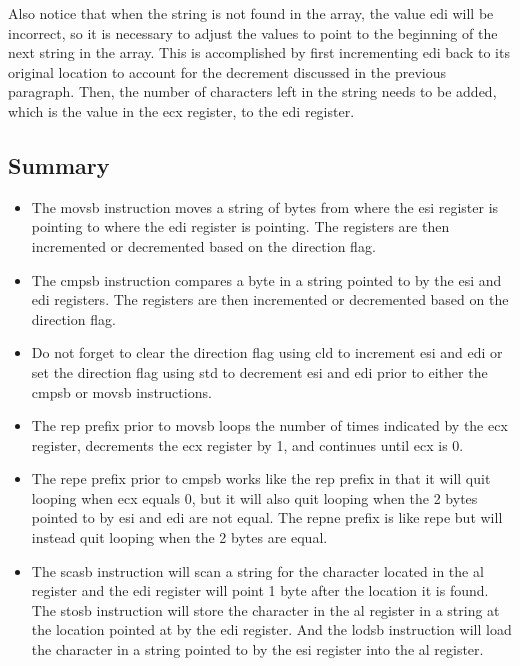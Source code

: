 \documentclass[10pt]{book}
\begin{document}
Also notice that when the string is not found in the array, the value edi will be incorrect, so it is necessary to adjust the values to point to the beginning of the next string in the array. This is accomplished by first incrementing edi back to its original location to account for the decrement discussed in the previous paragraph. Then, the number of characters left in the string needs to be added, which is the value in the ecx register, to the edi register.

\subsection{Summary}
\begin{itemize}
  \item The movsb instruction moves a string of bytes from where the esi register is pointing to where the edi register is pointing. The registers are then incremented or decremented based on the direction flag.
  \item The cmpsb instruction compares a byte in a string pointed to by the esi and edi registers. The registers are then incremented or decremented based on the direction flag.
  \item Do not forget to clear the direction flag using cld to increment esi and edi or set the direction flag using std to decrement esi and edi prior to either the cmpsb or movsb instructions.
  \item The rep prefix prior to movsb loops the number of times indicated by the ecx register, decrements the ecx register by 1, and continues until ecx is 0.
  \item The repe prefix prior to cmpsb works like the rep prefix in that it will quit looping when ecx equals 0, but it will also quit looping when the 2 bytes pointed to by esi and edi are not equal. The repne prefix is like repe but will instead quit looping when the 2 bytes are equal.
  \item The scasb instruction will scan a string for the character located in the al register and the edi register will point 1 byte after the location it is found. The stosb instruction will store the character in the al register in a string at the location pointed at by the edi register. And the lodsb instruction will load the character in a string pointed to by the esi register into the al register.
\end{itemize}
\end{document}
